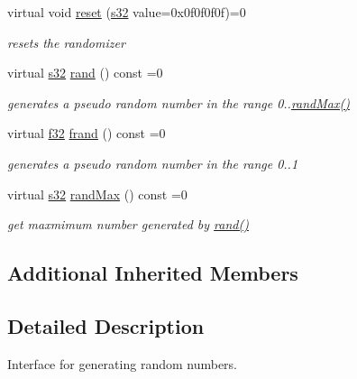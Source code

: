 \begin{DoxyCompactItemize}
virtual void \hyperlink{classirr_1_1IRandomizer_ac9d7c9464698f6e183992fb895fa5ac4}{reset} (\hyperlink{namespaceirr_ac66849b7a6ed16e30ebede579f9b47c6}{s32} value=0x0f0f0f0f)=0
\begin{DoxyCompactList}\small\item\em resets the randomizer \end{DoxyCompactList}\item 
\mbox{\label{classirr_1_1IRandomizer_a3a31414f525aad0c8815a451340a2729}} 
virtual \hyperlink{namespaceirr_ac66849b7a6ed16e30ebede579f9b47c6}{s32} \hyperlink{classirr_1_1IRandomizer_a3a31414f525aad0c8815a451340a2729}{rand} () const =0
\begin{DoxyCompactList}\small\item\em generates a pseudo random number in the range 0..\hyperlink{classirr_1_1IRandomizer_ac5f1856ac9e8a33bbb5ce1493cc6f351}{rand\+Max()} \end{DoxyCompactList}\item 
\mbox{\label{classirr_1_1IRandomizer_ab48106f4d9f171f31a39c147be2df9d6}} 
virtual \hyperlink{namespaceirr_a0277be98d67dc26ff93b1a6a1d086b07}{f32} \hyperlink{classirr_1_1IRandomizer_ab48106f4d9f171f31a39c147be2df9d6}{frand} () const =0
\begin{DoxyCompactList}\small\item\em generates a pseudo random number in the range 0..1 \end{DoxyCompactList}\item 
\mbox{\label{classirr_1_1IRandomizer_ac5f1856ac9e8a33bbb5ce1493cc6f351}} 
virtual \hyperlink{namespaceirr_ac66849b7a6ed16e30ebede579f9b47c6}{s32} \hyperlink{classirr_1_1IRandomizer_ac5f1856ac9e8a33bbb5ce1493cc6f351}{rand\+Max} () const =0
\begin{DoxyCompactList}\small\item\em get maxmimum number generated by \hyperlink{classirr_1_1IRandomizer_a3a31414f525aad0c8815a451340a2729}{rand()} \end{DoxyCompactList}\end{DoxyCompactItemize}
\subsection*{Additional Inherited Members}


\subsection{Detailed Description}
Interface for generating random numbers. 

